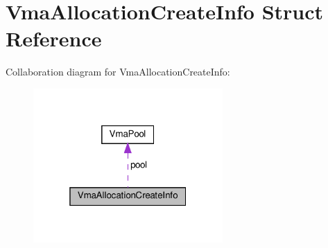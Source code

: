 \hypertarget{structVmaAllocationCreateInfo}{}\section{Vma\+Allocation\+Create\+Info Struct Reference}
\label{structVmaAllocationCreateInfo}


Collaboration diagram for Vma\+Allocation\+Create\+Info\+:\nopagebreak
\begin{figure}[H]
\begin{center}
\leavevmode
\includegraphics[width=205pt]{structVmaAllocationCreateInfo__coll__graph}
\end{center}
\end{figure}
